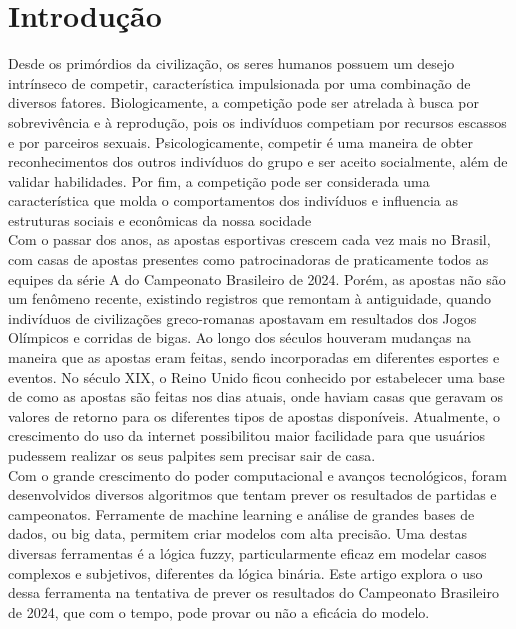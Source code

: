 \documentclass[conference]{IEEEtran}
\begin{document}
\section{Introdução}
\indent Desde os primórdios da civilização, os seres humanos possuem um desejo 
intrínseco de competir, característica impulsionada por uma combinação de
diversos fatores. Biologicamente, a competição pode ser atrelada à busca por 
sobrevivência e à reprodução, pois os indivíduos competiam por recursos 
escassos e por parceiros sexuais. Psicologicamente, competir é uma maneira de 
obter reconhecimentos dos outros indivíduos do grupo e ser aceito socialmente, 
além de validar habilidades. Por fim, a competição pode ser considerada uma 
característica que molda o comportamentos dos indivíduos e influencia as 
estruturas sociais e econômicas da nossa socidade \\
\indent Com o passar dos anos, as apostas esportivas crescem cada vez mais no 
Brasil, com casas de apostas presentes como patrocinadoras de praticamente 
todos as equipes da série A do Campeonato Brasileiro de 2024. Porém, as apostas 
não são um fenômeno recente, existindo registros que remontam à antiguidade, 
quando indivíduos de civilizações greco-romanas apostavam em resultados dos 
Jogos Olímpicos e corridas de bigas. Ao longo dos séculos houveram mudanças na 
maneira que as apostas eram feitas, sendo incorporadas em diferentes esportes e 
eventos. No século XIX, o Reino Unido ficou conhecido por estabelecer uma base 
de como as apostas são feitas nos dias atuais, onde haviam casas que geravam os 
valores de retorno para os diferentes tipos de apostas disponíveis. Atualmente, 
o crescimento do uso da internet possibilitou maior facilidade para que usuários 
pudessem realizar os seus palpites sem precisar sair de casa.\\
\indent Com o grande crescimento do poder computacional e avanços tecnológicos, 
foram desenvolvidos diversos algoritmos que tentam prever os resultados de 
partidas e campeonatos. Ferramente de machine learning e análise de grandes 
bases de dados, ou big data, permitem criar modelos com alta precisão. Uma 
destas diversas ferramentas é a lógica fuzzy, particularmente eficaz em modelar 
casos complexos e subjetivos, diferentes da lógica binária. Este artigo explora 
o uso dessa ferramenta na tentativa de prever os resultados do Campeonato 
Brasileiro de 2024, que com o tempo, pode provar ou não a eficácia do modelo.
\end{document}
